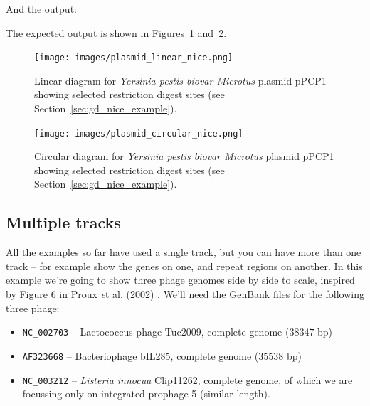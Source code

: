 \begin{htmlonly}
\noindent And the output:



\end{htmlonly}
\begin{latexonly}
\noindent The expected output is shown in Figures~\ref{fig:plasmid_linear_nice}
and~\ref{fig:plasmid_circular_nice}.
\begin{figure}[htbp]
\centering
\texttt{[image: images/plasmid\_linear\_nice.png]}
\caption{Linear diagram for \textit{Yersinia pestis biovar Microtus} plasmid
pPCP1 showing selected restriction digest sites (see
Section~\ref{sec:gd_nice_example}).}
\label{fig:plasmid_linear_nice}
\end{figure}
\begin{figure}[htbp]
\centering
\texttt{[image: images/plasmid\_circular\_nice.png]}
\caption{Circular diagram for \textit{Yersinia pestis biovar Microtus} plasmid
pPCP1 showing selected restriction digest sites (see
Section~\ref{sec:gd_nice_example}).}
\label{fig:plasmid_circular_nice}
\end{figure}
\end{latexonly}

\subsection{Multiple tracks}
\label{sec:gd_multiple_tracks}

All the examples so far have used a single track, but you can have more than
one track -- for example show the genes on one, and repeat regions on another.
In this example we're going to show three phage genomes side by side to scale,
inspired by Figure 6 in Proux {\textit et al.} (2002) \cite{proux2002}.
We'll need the GenBank files for the following three phage:
\begin{itemize}
\item \verb|NC_002703| -- Lactococcus phage Tuc2009, complete genome ($38347$ bp)
\item \verb|AF323668| -- Bacteriophage bIL285, complete genome ($35538$ bp)
\item \verb|NC_003212| -- \textit{Listeria innocua} Clip11262, complete genome,
of which we are focussing only on integrated prophage 5 (similar length).
\end{itemize}

